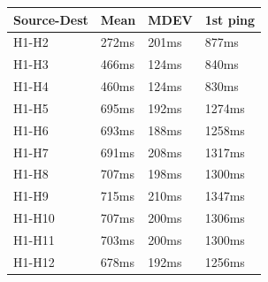 \documentclass[a4paper, 11pt, oneside]{article}
\begin{document}
\begin{table}[H]
\centering
\begin{tabular}{|l|l|l|l|}
\hline
\multicolumn{1}{|c|}{\textbf{Source-Dest}} & \multicolumn{1}{c|}{\textbf{Mean}} & \multicolumn{1}{c|}{\textbf{MDEV}} & \multicolumn{1}{c|}{\textbf{1st ping}} \\ \hline
H1-H2                                      & 272ms                              & 201ms                              & 877ms                                 \\ \hline
H1-H3                                      & 466ms                              & 124ms                              & 840ms                                 \\ \hline
H1-H4                                      & 460ms                              & 124ms                              & 830ms                                 \\ \hline
H1-H5                                      & 695ms                              & 192ms                              & 1274ms                                 \\ \hline
H1-H6                                      & 693ms                              & 188ms                              & 1258ms                                 \\ \hline
H1-H7                                      & 691ms                              & 208ms                              & 1317ms                                 \\ \hline
H1-H8                                      & 707ms                              & 198ms                              & 1300ms                                 \\ \hline
H1-H9                                      & 715ms                              & 210ms                              & 1347ms                                 \\ \hline
H1-H10                                      & 707ms                              & 200ms                              & 1306ms                                 \\ \hline
H1-H11                                     & 703ms                              & 200ms                              & 1300ms                                 \\ \hline
H1-H12                                     & 678ms                              & 192ms                              & 1256ms                                 \\ \hline

\end{tabular}
\end{table}
\end{document}
